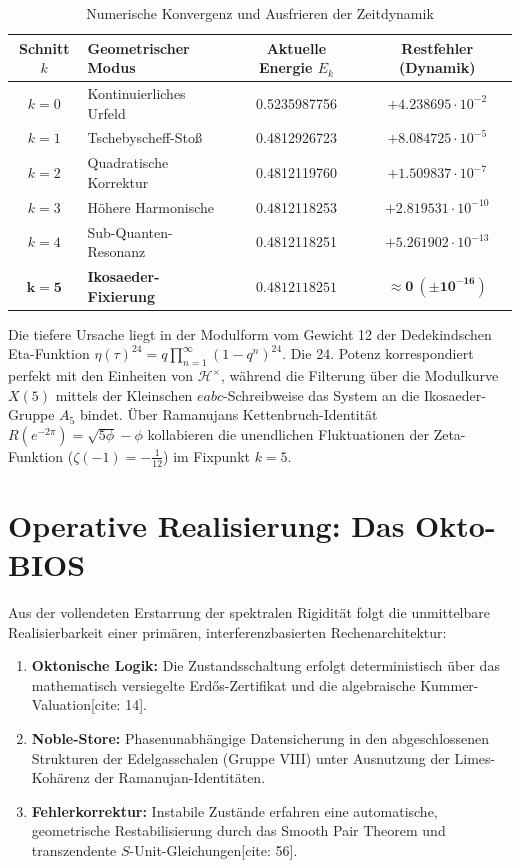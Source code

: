 \documentclass[12pt,a4paper]{article}
\begin{document}
	\begin{table}[h!]
		\centering
		\caption{Numerische Konvergenz und Ausfrieren der Zeitdynamik}
		\vspace{2mm}
		\begin{tabular}{clcc}
			\toprule
			Schnitt $k$ & Geometrischer Modus & Aktuelle Energie $E_k$ & Restfehler (Dynamik) \\
			\midrule
			$k=0$ & Kontinuierliches Urfeld & 0.5235987756 & $+4.238695 \cdot 10^{-2}$ \\
			$k=1$ & Tschebyscheff-Stoß & 0.4812926723 & $+8.084725 \cdot 10^{-5}$ \\
			$k=2$ & Quadratische Korrektur & 0.4812119760 & $+1.509837 \cdot 10^{-7}$ \\
			$k=3$ & Höhere Harmonische & 0.4812118253 & $+2.819531 \cdot 10^{-10}$ \\
			$k=4$ & Sub-Quanten-Resonanz & 0.4812118251 & $+5.261902 \cdot 10^{-13}$ \\
			$\mathbf{k=5}$ & \textbf{Ikosaeder-Fixierung} & $\mathbf{0.4812118251}$ & $\mathbf{\approx 0 \ (\pm 10^{-16})}$ \\
			\bottomrule
		\end{tabular}
	\end{table}
	
	Die tiefere Ursache liegt in der Modulform vom Gewicht 12 der Dedekindschen Eta-Funktion $\eta(\tau)^{24} = q\prod_{n=1}^{\infty}(1-q^{n})^{24}$. Die 24. Potenz korrespondiert perfekt mit den Einheiten von $\mathcal{H}^\times$, während die Filterung über die Modulkurve $X(5)$ mittels der Kleinschen $eabc$-Schreibweise das System an die Ikosaeder-Gruppe $A_5$ bindet. Über Ramanujans Kettenbruch-Identität $R(e^{-2\pi}) = \sqrt{5\phi}-\phi$ kollabieren die unendlichen Fluktuationen der Zeta-Funktion ($\zeta(-1)=-\frac{1}{12}$) im Fixpunkt $k=5$.
	
	\section{Operative Realisierung: Das Okto-BIOS}
	Aus der vollendeten Erstarrung der spektralen Rigidität folgt die unmittelbare Realisierbarkeit einer primären, interferenzbasierten Rechenarchitektur:
	\begin{enumerate}
		\item \textbf{Oktonische Logik:} Die Zustandsschaltung erfolgt deterministisch über das mathematisch versiegelte Erd\H{o}s-Zertifikat und die algebraische Kummer-Valuation[cite: 14].
		\item \textbf{Noble-Store:} Phasenunabhängige Datensicherung in den abgeschlossenen Strukturen der Edelgasschalen (Gruppe VIII) unter Ausnutzung der Limes-Kohärenz der Ramanujan-Identitäten.
		\item \textbf{Fehlerkorrektur:} Instabile Zustände erfahren eine automatische, geometrische Restabilisierung durch das Smooth Pair Theorem und transzendente $S$-Unit-Gleichungen[cite: 56].
	\end{enumerate}
	
\end{document}
